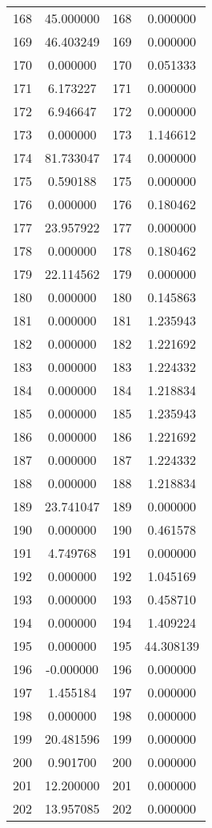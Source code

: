\documentclass[12pt]{article}
\begin{document}
\begin{longtable}{@{}cccc@{}}
168 & 45.000000 & 168 & 0.000000 \\
169 & 46.403249 & 169 & 0.000000 \\
170 & 0.000000 & 170 & 0.051333 \\
171 & 6.173227 & 171 & 0.000000 \\
172 & 6.946647 & 172 & 0.000000 \\
173 & 0.000000 & 173 & 1.146612 \\
174 & 81.733047 & 174 & 0.000000 \\
175 & 0.590188 & 175 & 0.000000 \\
176 & 0.000000 & 176 & 0.180462 \\
177 & 23.957922 & 177 & 0.000000 \\
178 & 0.000000 & 178 & 0.180462 \\
179 & 22.114562 & 179 & 0.000000 \\
180 & 0.000000 & 180 & 0.145863 \\
181 & 0.000000 & 181 & 1.235943 \\
182 & 0.000000 & 182 & 1.221692 \\
183 & 0.000000 & 183 & 1.224332 \\
184 & 0.000000 & 184 & 1.218834 \\
185 & 0.000000 & 185 & 1.235943 \\
186 & 0.000000 & 186 & 1.221692 \\
187 & 0.000000 & 187 & 1.224332 \\
188 & 0.000000 & 188 & 1.218834 \\
189 & 23.741047 & 189 & 0.000000 \\
190 & 0.000000 & 190 & 0.461578 \\
191 & 4.749768 & 191 & 0.000000 \\
192 & 0.000000 & 192 & 1.045169 \\
193 & 0.000000 & 193 & 0.458710 \\
194 & 0.000000 & 194 & 1.409224 \\
195 & 0.000000 & 195 & 44.308139 \\
196 & -0.000000 & 196 & 0.000000 \\
197 & 1.455184 & 197 & 0.000000 \\
198 & 0.000000 & 198 & 0.000000 \\
199 & 20.481596 & 199 & 0.000000 \\
200 & 0.901700 & 200 & 0.000000 \\
201 & 12.200000 & 201 & 0.000000 \\
202 & 13.957085 & 202 & 0.000000 \\

\end{longtable}
\end{document}
